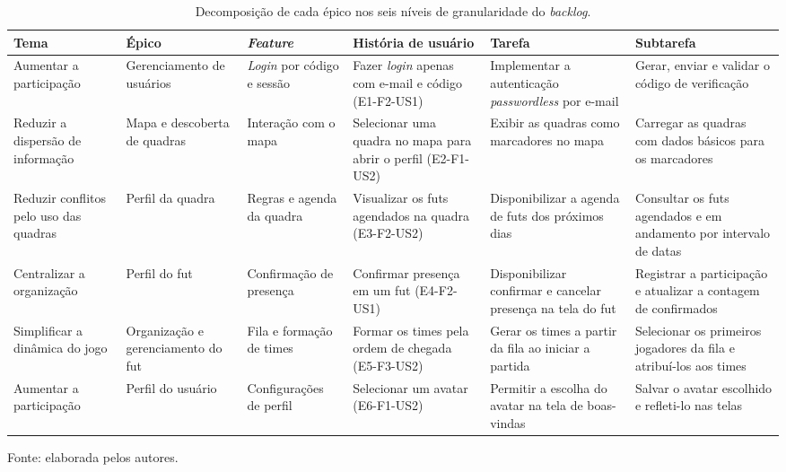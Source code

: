 \begin{apendicesenv}
    \begin{table}
        \centering
        \caption{Decomposição de cada épico nos seis níveis de granularidade do \textit{backlog}.}
        \label{tab:backlog-temas}
        \footnotesize
        \renewcommand{\arraystretch}{1.3}
        \begin{tabular}{p{2.6cm}p{2.4cm}p{2.6cm}p{3.6cm}p{4.1cm}p{4.1cm}}
        \toprule
        \textbf{Tema} & \textbf{Épico} & \textbf{\textit{Feature}} & \textbf{História de usuário} & \textbf{Tarefa} & \textbf{Subtarefa} \\
        \midrule
        Aumentar a participação & Gerenciamento de usuários & \textit{Login} por código e sessão & Fazer \textit{login} apenas com e-mail e código (E1-F2-US1) & Implementar a autenticação \textit{passwordless} por e-mail & Gerar, enviar e validar o código de verificação \\
        Reduzir a dispersão de informação & Mapa e descoberta de quadras & Interação com o mapa & Selecionar uma quadra no mapa para abrir o perfil (E2-F1-US2) & Exibir as quadras como marcadores no mapa & Carregar as quadras com dados básicos para os marcadores \\
        Reduzir conflitos pelo uso das quadras & Perfil da quadra & Regras e agenda da quadra & Visualizar os futs agendados na quadra (E3-F2-US2) & Disponibilizar a agenda de futs dos próximos dias & Consultar os futs agendados e em andamento por intervalo de datas \\
        Centralizar a organização & Perfil do fut & Confirmação de presença & Confirmar presença em um fut (E4-F2-US1) & Disponibilizar confirmar e cancelar presença na tela do fut & Registrar a participação e atualizar a contagem de confirmados \\
        Simplificar a dinâmica do jogo & Organização e gerenciamento do fut & Fila e formação de times & Formar os times pela ordem de chegada (E5-F3-US2) & Gerar os times a partir da fila ao iniciar a partida & Selecionar os primeiros jogadores da fila e atribuí-los aos times \\
        Aumentar a participação & Perfil do usuário & Configurações de perfil & Selecionar um avatar (E6-F1-US2) & Permitir a escolha do avatar na tela de boas-vindas & Salvar o avatar escolhido e refleti-lo nas telas \\
        \bottomrule
        \end{tabular}

        \vspace{2pt}
        {\footnotesize Fonte: elaborada pelos autores.}
    \end{table}


\end{apendicesenv}
